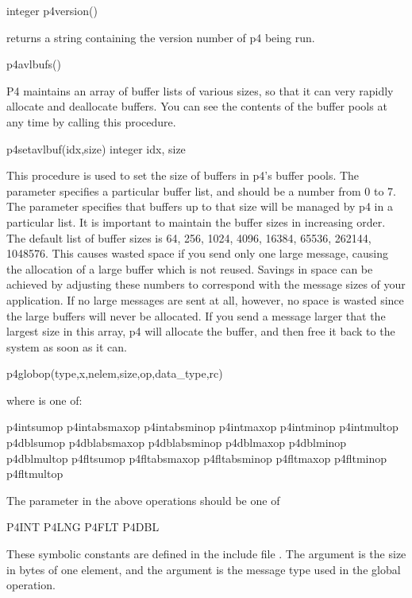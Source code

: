 \begin{example}
integer p4version()
\end{example}
\noindent
returns a string containing the version number of p4 being run.

\begin{example}
p4avlbufs()
\end{example}
\noindent
P4 maintains an array of buffer lists of various sizes, so that it can very
rapidly allocate and deallocate buffers.  You can see the contents of the
buffer pools at any time by calling this procedure.

\begin{example}
p4setavlbuf(idx,size)
integer idx, size
\end{example}
\noindent
This procedure is used to set the size of buffers in p4's buffer pools.  The
parameter  specifies a particular buffer list, and should be a
number from 0 to 7.  The  parameter specifies that buffers up to
that size will be managed by p4 in a particular list.  It is important to
maintain the buffer sizes in increasing order.  The default list of buffer
sizes is {64, 256, 1024, 4096, 16384, 65536, 262144, 1048576}.  This causes
wasted space if you send only one large message, causing the allocation of a
large buffer which is not reused.  Savings in space can be achieved by
adjusting these numbers to correspond with the message sizes of your
application.  If no large messages are sent at all, however, no space is
wasted since the large buffers will never be allocated.  If you send a message
larger that the largest size in this array, p4 will allocate the buffer, and
then free it back to the system as soon as it can.

\begin{example}
p4globop(type,x,nelem,size,op,data_type,rc)
\end{example}
\noindent
where  is one of:
\begin{example}
   p4intsumop
   p4intabsmaxop
   p4intabsminop
   p4intmaxop
   p4intminop
   p4intmultop
   p4dblsumop
   p4dblabsmaxop
   p4dblabsminop
   p4dblmaxop
   p4dblminop
   p4dblmultop
   p4fltsumop
   p4fltabsmaxop
   p4fltabsminop
   p4fltmaxop
   p4fltminop
   p4fltmultop
\end{example}

The  parameter in the above operations should be one of
\begin{example}
  P4INT
  P4LNG
  P4FLT
  P4DBL  
\end{example}
\noindent
These symbolic constants are defined in the include file .  The
 argument is the size in bytes of one element, and the 
argument is the message type used in the global operation.

